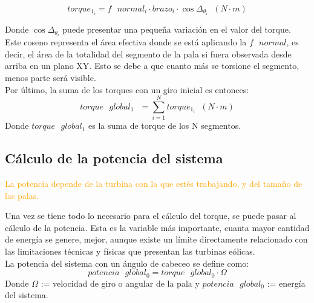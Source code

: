   \begin{equation}
  torque_{1_i} = f \text{ } normal_i \cdot brazo_i \cdot \cos{\Delta_{\theta_{i}}} \hspace{7pt} (N \cdot m)
 \label{def:torque_algebraico_torsion}
 \end{equation}
 
Donde $ \cos{\Delta_{\theta_{i}}} $ puede presentar una pequeña variación en el valor del torque. Este coseno representa el área efectiva donde se está aplicando la $ f \text{ } normal $, es decir, el área de la totalidad del segmento de la pala si fuera observada desde arriba en un plano XY. Esto se debe a que cuanto más se torsione el segmento, menos parte será visible.\\

Por último, la suma de los torques con un giro inicial es entonces:
\begin{equation}
  torque \text{ } global_1 \text{ } = \sum_{i=1}^{N} torque_{1_i} \hspace{7pt} (N \cdot m)
 \label{def:torque_global_1}
\end{equation}
Donde $torque \text{ } global_1$ es la suma de torque de los N segmentos.





















\subsection{Cálculo de la potencia del sistema}
\label{section:pot_sistema}
 
 \textcolor{orange}{\huge La potencia depende de la turbina con la que estés trabajando, y del tamaño de las palas.}
 
 Una vez se tiene todo lo necesario para el cálculo del torque, se puede pasar al cálculo de la potencia. Esta es la variable más importante, cuanta mayor cantidad de energía se genere, mejor, aunque existe un límite directamente relacionado con las limitaciones técnicas y físicas que presentan las turbinas eólicas. \\
 
 
  La potencia del sistema con un ángulo de cabeceo se define como:
  \begin{equation}
  potencia \text{ } global_0 = torque \text{ } global_0 \cdot \Omega  
 \label{def:potencia_giro_inicial}
 \end{equation}
  Donde $\Omega$ := velocidad de giro o angular de la pala y $potencia \text{ } global_0$ := energía del sistema.\\
 
